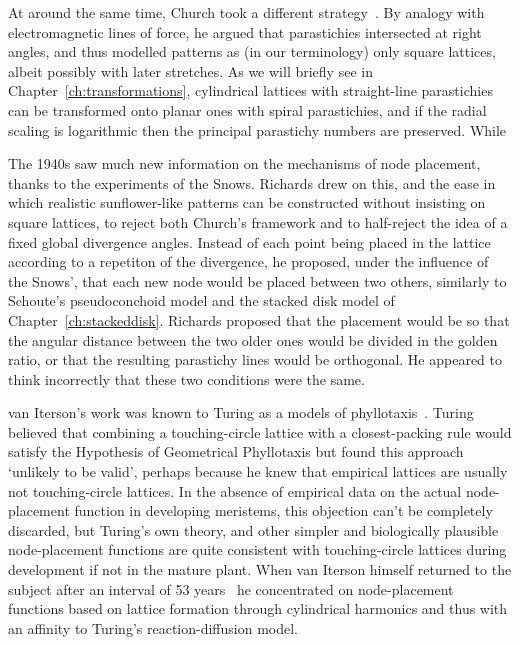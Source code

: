 At around the same time, Church took a different strategy~\cite{churchRelationPhyllotaxisMechanical1904}. By analogy with electromagnetic lines of force, he argued that parastichies intersected at right angles,  and thus modelled patterns as (in our terminology) only square lattices, albeit possibly with later stretches. 
  As we will briefly see in Chapter~\ref{ch:transformations}, cylindrical lattices with straight-line parastichies can be transformed onto planar ones with spiral parastichies, and if the radial scaling is logarithmic then the principal parastichy numbers are preserved. While 

The 1940s saw much new information on the mechanisms of node placement, thanks to the experiments of the Snows. Richards drew on this, and the ease in which realistic sunflower-like patterns can be constructed without insisting on square lattices, to reject both Church's framework and to half-reject the idea of  a fixed global divergence angles. Instead of each point being placed in the lattice according to a repetiton of the divergence, he proposed, under the influence of the Snows', that each new node would be placed between two others, similarly to Schoute's pseudoconchoid model and the stacked disk model of Chapter~\ref{ch:stackeddisk}. Richards proposed that the placement would be so that the angular distance between the two older ones would be divided in the golden ratio, or that the resulting parastichy lines would be orthogonal. He appeared to think incorrectly that these two conditions were the same. 

van Iterson's work was known to Turing as a models of phyllotaxis~\cite[Section 14]{turingMorphogenTheoryPhyllotaxis2013}. Turing believed that combining a touching-circle lattice with a closest-packing rule would satisfy the Hypothesis of Geometrical Phyllotaxis but found this approach `unlikely to be valid', perhaps because he knew that empirical lattices are usually not  touching-circle lattices.  In the absence of empirical data on the actual node-placement function in developing meristems, this objection can't be completely discarded, but Turing's own theory, and other simpler and biologically plausible node-placement functions are quite consistent with touching-circle lattices during development if not in the mature plant. When van Iterson himself returned to the subject after an interval of 53 years~\autocite{vanitersonjrNewStudiesPhyllotaxis1960} he concentrated on node-placement functions based on lattice formation through cylindrical harmonics and thus with an affinity to Turing's reaction-diffusion model. 

